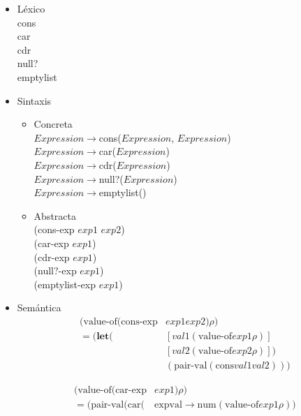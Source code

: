 \documentclass{article}
\begin{document}
\begin{enumerate}
    \begin{itemize}
        \item Léxico \\
        cons \\
        car \\
        cdr \\ 
        null? \\ 
        emptylist  
        \item Sintaxis 
        \begin{itemize}
            \item Concreta \\
            $Expression$$\to$cons($Expression$, $Expression$) \\
            $Expression$$\to$car($Expression$) \\
            $Expression$$\to$cdr($Expression$) \\
            $Expression$$\to$null?($Expression$) \\
            $Expression$$\to$emptylist() 
            \item Abstracta \\
            (cons-exp $exp1$ $exp2$) \\
            (car-exp $exp1$) \\
            (cdr-exp $exp1$) \\
            (null?-exp $exp1$) \\
            (emptylist-exp $exp1$)
        \end{itemize}
        \item Semántica 
        \begin{align*}
            (\text{value-of}(\text{cons-exp}& exp1 exp2) \rho ) \\
            =(\textbf{let} (&[val1 (\text{value-of} exp1 \rho)] \\
                         &[val2 (\text{value-of} exp2 \rho)]) \\
                         & (\text{pair-val} (\text{cons} val1 val2)))
        \end{align*}
        
        \begin{align*}
            (\text{value-of}(\text{car-exp}& exp1) \rho ) \\
            =(\text{pair-val} (\text{car} (&\text{expval} \to \text{num} (\text{value-of} exp1 \rho))\\
        \end{align*}
        

\end{itemize}
\end{enumerate}
\end{document}
